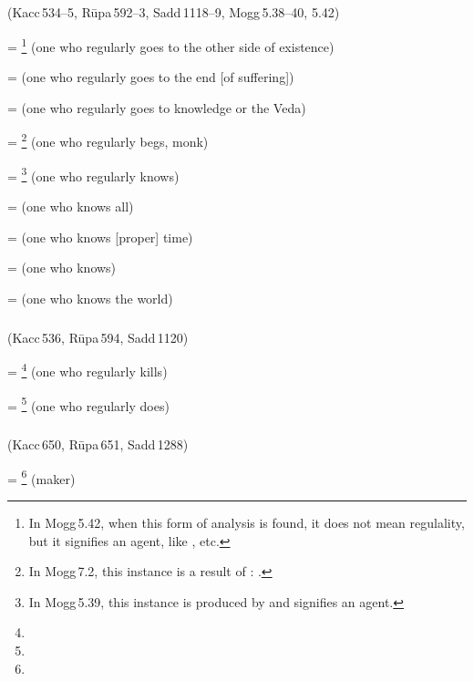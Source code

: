 \subparagraph*{} (Kacc\,534--5, R\=upa\,592--3, Sadd\,1118--9, Mogg\,5.38--40, 5.42)\label{pacck2:ruu}\label{pacck2:kuu}

 = \footnote{ In Mogg\,5.42, when this form of analysis is found, it does not mean regulality, but it signifies an agent, like , etc.} (one who regularly goes to the other side of existence)\par
{} =  (one who regularly goes to the end [of suffering])\par
{} =  (one who regularly goes to knowledge or the Veda)\par
{} = \footnote{ In Mogg\,7.2, this instance is a result of : .} (one who regularly begs, monk)\par
{} = \footnote{ In Mogg\,5.39, this instance is produced by  and signifies an agent.} (one who regularly knows)\par
{} =  (one who knows all)\par
{} =  (one who knows [proper] time)\par
{} =  (one who knows)\par
{} =  (one who knows the world)\par

\subparagraph*{} (Kacc\,536, R\=upa\,594, Sadd\,1120)\label{pacck2:dnuka}

 = \footnote{} (one who regularly kills)\par
{} = \footnote{} (one who regularly does)\par

\subparagraph*{} (Kacc\,650, R\=upa\,651, Sadd\,1288)\label{pacck2:dnu}

 = \footnote{} (maker)\par

